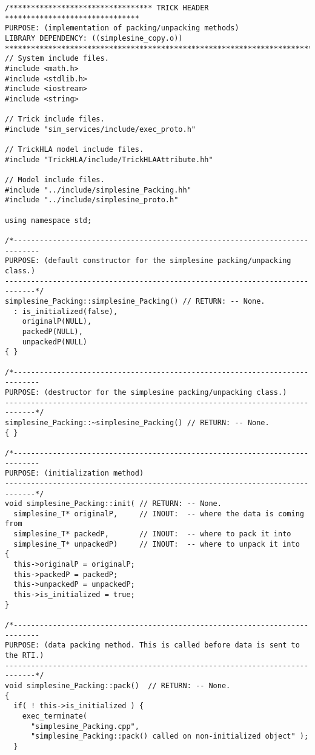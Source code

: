 \begin{lstlisting}[caption={{\tt simplesine\_Packing} class methods}]
/********************************* TRICK HEADER *******************************
PURPOSE: (implementation of packing/unpacking methods)
LIBRARY DEPENDENCY: ((simplesine_copy.o))
*******************************************************************************/
// System include files.
#include <math.h>
#include <stdlib.h>
#include <iostream>
#include <string>

// Trick include files.
#include "sim_services/include/exec_proto.h"

// TrickHLA model include files.
#include "TrickHLA/include/TrickHLAAttribute.hh"

// Model include files.
#include "../include/simplesine_Packing.hh"
#include "../include/simplesine_proto.h"

using namespace std;

/*----------------------------------------------------------------------------
PURPOSE: (default constructor for the simplesine packing/unpacking class.)
-----------------------------------------------------------------------------*/
simplesine_Packing::simplesine_Packing() // RETURN: -- None.
  : is_initialized(false),
    originalP(NULL),
    packedP(NULL),
    unpackedP(NULL)
{ }

/*----------------------------------------------------------------------------
PURPOSE: (destructor for the simplesine packing/unpacking class.)
-----------------------------------------------------------------------------*/
simplesine_Packing::~simplesine_Packing() // RETURN: -- None.
{ }

/*----------------------------------------------------------------------------
PURPOSE: (initialization method)
-----------------------------------------------------------------------------*/
void simplesine_Packing::init( // RETURN: -- None.
  simplesine_T* originalP,     // INOUT:  -- where the data is coming from
  simplesine_T* packedP,       // INOUT:  -- where to pack it into
  simplesine_T* unpackedP)     // INOUT:  -- where to unpack it into
{
  this->originalP = originalP;
  this->packedP = packedP;
  this->unpackedP = unpackedP;
  this->is_initialized = true;
}

/*----------------------------------------------------------------------------
PURPOSE: (data packing method. This is called before data is sent to the RTI.)
-----------------------------------------------------------------------------*/
void simplesine_Packing::pack()  // RETURN: -- None.
{
  if( ! this->is_initialized ) {
    exec_terminate(
      "simplesine_Packing.cpp",
      "simplesine_Packing::pack() called on non-initialized object" );
  }


\end{lstlisting}
